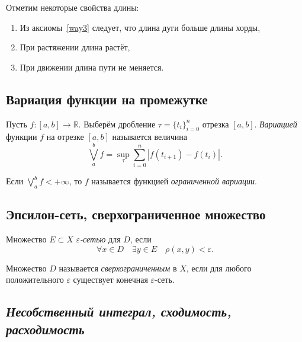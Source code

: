 \begin{remark}
	Отметим некоторые свойства длины:
	\begin{enumerate}
		\item Из аксиомы~\ref{way3} следует, что длина дуги больше длины хорды,
		\item При растяжении длина растёт,
		\item При движении длина пути не меняется.
	\end{enumerate}
\end{remark}

\subsection{Вариация функции на промежутке}

\begin{definition}
	Пусть \(f \colon [a, b] \to \mathbb{R}\). Выберём дробление \(\tau = \{t_i\}_{i = 0}^n\) отрезка \([a, b]\). \textit{Вариацией}  функции \(f\) на отрезке \([a, b]\) называется величина \[
	\bigvee_a^b f = \sup_\tau \sum_{i = 0}^n |f(t_{i + 1}) - f(t_i)|.
	\]
\end{definition}

\begin{remark} \hypertarget{ogrvar}{}
	Если \(\bigvee\limits_a^b f < +\infty\), то \(f\) называется функцией \textit{ограниченной вариации}.
\end{remark}

\subsection{Эпсилон-сеть, сверхограниченное множество}

\begin{ndefinition}
	Множество \(E \subset X\)  \textit{\(\varepsilon\)-сетью} для \(D\), если \[
	\forall x \in D \quad \exists y \in E \quad \rho(x, y) < \varepsilon.
	\]
\end{ndefinition}

\begin{ndefinition}
	Множество \(D\) называется \textit{сверхограниченным} в \(X\), если для любого положительного \(\varepsilon\) существует конечная \(\varepsilon\)-сеть.
\end{ndefinition}

\subsection{\itshape Несобственный интеграл, сходимость, расходимость}

